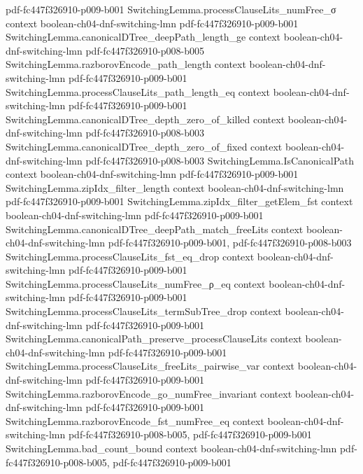 \begin{theorem}
  {pdf-fc447f326910-p009-b001}
\proofstep
  {SwitchingLemma.processClauseLits_numFree_σ}
  {context}
  {boolean-ch04-dnf-switching-lmn}
  {pdf-fc447f326910-p009-b001}
\proofstep
  {SwitchingLemma.canonicalDTree_deepPath_length_ge}
  {context}
  {boolean-ch04-dnf-switching-lmn}
  {pdf-fc447f326910-p008-b005}
\proofstep
  {SwitchingLemma.razborovEncode_path_length}
  {context}
  {boolean-ch04-dnf-switching-lmn}
  {pdf-fc447f326910-p009-b001}
\proofstep
  {SwitchingLemma.processClauseLits_path_length_eq}
  {context}
  {boolean-ch04-dnf-switching-lmn}
  {pdf-fc447f326910-p009-b001}
\proofstep
  {SwitchingLemma.canonicalDTree_depth_zero_of_killed}
  {context}
  {boolean-ch04-dnf-switching-lmn}
  {pdf-fc447f326910-p008-b003}
\proofstep
  {SwitchingLemma.canonicalDTree_depth_zero_of_fixed}
  {context}
  {boolean-ch04-dnf-switching-lmn}
  {pdf-fc447f326910-p008-b003}
\proofstep
  {SwitchingLemma.IsCanonicalPath}
  {context}
  {boolean-ch04-dnf-switching-lmn}
  {pdf-fc447f326910-p009-b001}
\proofstep
  {SwitchingLemma.zipIdx_filter_length}
  {context}
  {boolean-ch04-dnf-switching-lmn}
  {pdf-fc447f326910-p009-b001}
\proofstep
  {SwitchingLemma.zipIdx_filter_getElem_fst}
  {context}
  {boolean-ch04-dnf-switching-lmn}
  {pdf-fc447f326910-p009-b001}
\proofstep
  {SwitchingLemma.canonicalDTree_deepPath_match_freeLits}
  {context}
  {boolean-ch04-dnf-switching-lmn}
  {pdf-fc447f326910-p009-b001,
    pdf-fc447f326910-p008-b003}
\proofstep
  {SwitchingLemma.processClauseLits_fst_eq_drop}
  {context}
  {boolean-ch04-dnf-switching-lmn}
  {pdf-fc447f326910-p009-b001}
\proofstep
  {SwitchingLemma.processClauseLits_numFree_ρ_eq}
  {context}
  {boolean-ch04-dnf-switching-lmn}
  {pdf-fc447f326910-p009-b001}
\proofstep
  {SwitchingLemma.processClauseLits_termSubTree_drop}
  {context}
  {boolean-ch04-dnf-switching-lmn}
  {pdf-fc447f326910-p009-b001}
\proofstep
  {SwitchingLemma.canonicalPath_preserve_processClauseLits}
  {context}
  {boolean-ch04-dnf-switching-lmn}
  {pdf-fc447f326910-p009-b001}
\proofstep
  {SwitchingLemma.processClauseLits_freeLits_pairwise_var}
  {context}
  {boolean-ch04-dnf-switching-lmn}
  {pdf-fc447f326910-p009-b001}
\proofstep
  {SwitchingLemma.razborovEncode_go_numFree_invariant}
  {context}
  {boolean-ch04-dnf-switching-lmn}
  {pdf-fc447f326910-p009-b001}
\proofstep
  {SwitchingLemma.razborovEncode_fst_numFree_eq}
  {context}
  {boolean-ch04-dnf-switching-lmn}
  {pdf-fc447f326910-p008-b005,
    pdf-fc447f326910-p009-b001}
\proofstep
  {SwitchingLemma.bad_count_bound}
  {context}
  {boolean-ch04-dnf-switching-lmn}
  {pdf-fc447f326910-p008-b005,
    pdf-fc447f326910-p009-b001}

\end{theorem}
